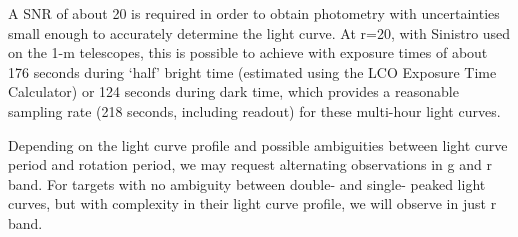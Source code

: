 \documentclass[11pt]{article}
\begin{document}
A SNR of about 20 is required in order to obtain photometry with
uncertainties small enough to accurately determine the light curve. At
r=20, with Sinistro used on the 1-m telescopes, this is possible to
achieve with exposure times of about 176 seconds during `half' bright
time (estimated using the LCO Exposure Time Calculator) or 124 seconds
during dark time, which provides a reasonable sampling rate (218
seconds, including readout) for these multi-hour light curves. 

Depending on the light curve profile and possible ambiguities between
light curve period and rotation period, we may request alternating
observations in g and r band. For targets with no ambiguity between
double- and single- peaked light curves, but with complexity in their
light curve profile, we will observe in just r band.


% 



% 
% 
%
\end{document}
